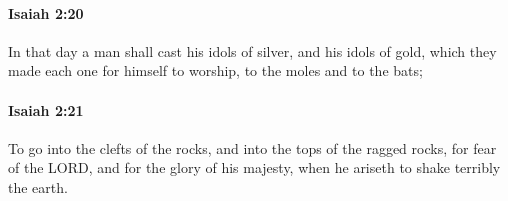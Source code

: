 		\paragraph{Isaiah 2:20} %
			\label{ISAIAH-2-20}

			In that day a man shall cast his idols of silver, and his idols of gold, which they made each one for himself to worship, to the moles and to the bats;


		\paragraph{Isaiah 2:21} %
			\label{ISAIAH-2-21}

			To go into the clefts of the rocks, and into the tops of the ragged rocks, for fear of the LORD, and for the glory of his majesty, when he ariseth to shake terribly the earth.


